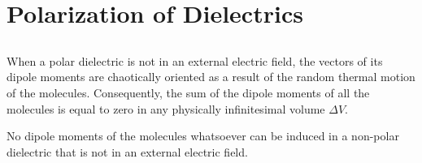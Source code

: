 \section{Polarization of Dielectrics}
\label{sec-18.2}

\subsection{}\label{18.2.1} When a polar dielectric  is not in an external electric field, the vectors of its dipole moments are chaotically oriented as a result of the random thermal motion of the molecules. Consequently, the sum of the dipole moments of all the molecules is equal to zero in any physically infinitesimal volume $\Delta V$.

No dipole moments of the molecules whatsoever can be induced  in a non-polar dielectric that is not in an external electric field.

